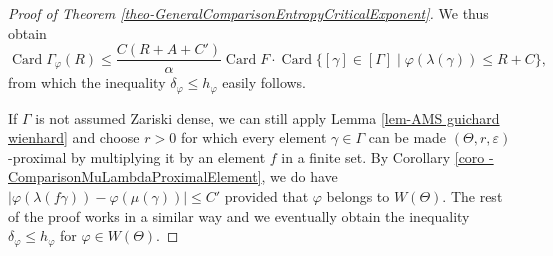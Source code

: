\documentclass[10pt,a4paper]{article}
\theoremstyle{definition}
\DeclareMathOperator{\Card}{Card}
\let\epsilon\varepsilon
\let\phi\varphi
\let\G\Gamma
\let\g\gamma
\begin{document}
\begin{proof}[Proof of Theorem \ref{theo-GeneralComparisonEntropyCriticalExponent}]
We thus obtain
\[\Card \Gamma_\phi(R) \leq \frac{C(R+A+C')}{\alpha} \Card F \cdot \Card \{[\g]\in [\Gamma] \mid \varphi(\lambda(\g))\leq R+C\},\]
from which the inequality $\delta_\varphi \leq h_\varphi$ easily follows.

If $\Gamma$ is not assumed Zariski dense, we can still apply Lemma \ref{lem-AMS guichard wienhard} and choose $r>0$ for which every element $\g\in \G$ can be made $(\Theta,r,\epsilon)$-proximal by multiplying it by an element $f$ in a finite set. By Corollary \ref{coro - ComparisonMuLambdaProximalElement}, we do have $|\phi(\lambda(f \g)) - \phi(\mu(\g))| \leq C'$ provided that $\phi$ belongs to $W(\Theta)$. The rest of the proof works in a similar way and we eventually obtain the inequality $\delta_\phi \leq h_\phi$ for $\phi \in W(\Theta)$.
\end{proof}
\end{document}
